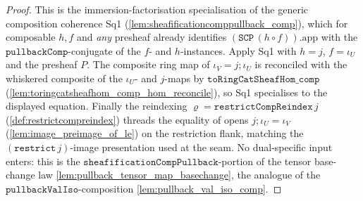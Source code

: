 \begin{proof}
  \leanok
  This is the immersion-factorisation specialisation of the generic composition coherence Sq1
  (\cref{lem:sheafificationcomppullback_comp}), which for composable \(h, f\) and \emph{any} presheaf
  already identifies \((\mathtt{SCP}\,(h\circ f)).\mathrm{app}\) with the
  \(\mathtt{pullbackComp}\)-conjugate of the \(f\)- and \(h\)-instances. Apply Sq1 with \(h = j\),
  \(f = \iota_U\) and the presheaf \(P\). The composite ring map of \(\iota_V = j \mathbin{;} \iota_U\)
  is reconciled with the whiskered composite of the \(\iota_U\)- and \(j\)-maps by
  \(\mathtt{toRingCatSheafHom\_comp}\) (\cref{lem:toringcatsheafhom_comp_hom_reconcile}), so Sq1
  specialises to the displayed equation. Finally the reindexing
  \(\varrho = \mathtt{restrictCompReindex}\,j\) (\cref{def:restrictcompreindex}) threads the equality of
  opens \(j \mathbin{;} \iota_U = \iota_V\) (\cref{lem:image_preimage_of_le}) on the restriction flank,
  matching the \((\mathtt{restrict}\,j)\)-image presentation used at the seam. No dual-specific input
  enters: this is the \(\mathtt{sheafificationCompPullback}\)-portion of the tensor base-change law
  \cref{lem:pullback_tensor_map_basechange}, the analogue of the
  \(\mathtt{pullbackValIso}\)-composition \cref{lem:pullback_val_iso_comp}.
\end{proof}

